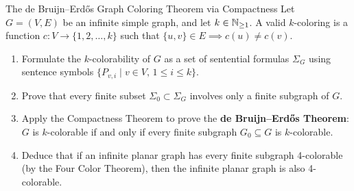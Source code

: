 \begin{exercise}{The de Bruijn--Erd\H{o}s Graph Coloring Theorem via Compactness}
Let $G = (V, E)$ be an infinite simple graph, and let $k \in \mathbb{N}_{\ge 1}$.
A valid $k$-coloring is a function $c: V \to \{1, 2, \dots, k\}$ such that $\{u, v\} \in E \implies c(u) \ne c(v)$.
\begin{enumerate}[leftmargin=1.5em,itemsep=2pt]
  \item Formulate the $k$-colorability of $G$ as a set of sentential formulas $\Sigma_G$ using sentence symbols $\{P_{v, i} \mid v \in V,\, 1 \le i \le k\}$.
  \item Prove that every finite subset $\Sigma_0 \subset \Sigma_G$ involves only a finite subgraph of $G$.
  \item Apply the Compactness Theorem to prove the \textbf{de Bruijn--Erd\H{o}s Theorem}: $G$ is $k$-colorable if and only if every finite subgraph $G_0 \subseteq G$ is $k$-colorable.
  \item Deduce that if an infinite planar graph has every finite subgraph 4-colorable (by the Four Color Theorem), then the infinite planar graph is also 4-colorable.
\end{enumerate}
\end{exercise}

\begin{tabletworkspace}[5.0cm]
\end{tabletworkspace}

